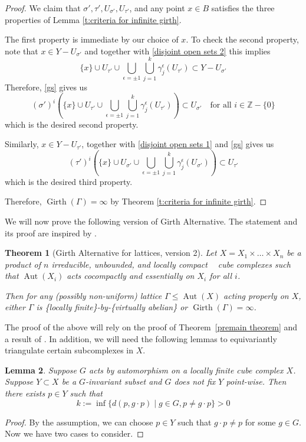 \documentclass{amsart}
\newtheorem{theorem}{Theorem}%
\newtheorem{lemma}[theorem]{Lemma}
\theoremstyle{definition}
\newtheorem*{Notation warning}{Warning on notations}
\newtheorem*{Sketch of proof}{Sketch of proof for Theorem C}
\newcommand{\gs}{\sigma }
\DeclareMathOperator{\cat}{CAT(0)}
\DeclareMathOperator{\Gir}{Girth}
\def\aut{\mathop{\mathrm{Aut}}\nolimits}
\begin{document}
\begin{sloppypar}
\begin{proof}
 We claim that $\gs',\tau',U_{\gs'},U_{\tau'}$, and any point $x\in B$ satisfies the three properties of Lemma \ref{t:criteria for infinite girth}.
 \medskip
 
 The first property is immediate by our choice of $x$.
 To check the second property, note that $x\in Y-U_{\gs'}$ and together with \eqref{disjoint open sets 2} this implies
\[
 \{x\}\cup U_{\tau'}\cup \bigcup_{\epsilon=\pm 1}\bigcup_{j=1}^k\gamma_j^\epsilon (U_{\tau'})\subset Y-U_{\gs'} 
 \] 
  Therefore, \eqref{gs} gives us
 \[
 (\gs')^i(\{x\}\cup U_{\tau'}\cup \bigcup_{\epsilon=\pm 1}\bigcup_{j=1}^k\gamma_j^\epsilon (U_{\tau'}))\subset U_{\gs'} \quad \text{for all } i\in \mathbb{Z}-\{0\}
 \]
 which is the desired second property.
 \medskip
 
\noindent Similarly, $x\in Y-U_{\tau'}$, together with \eqref{disjoint open sets 1} and \eqref{gs} gives us
 \[
 (\tau')^i(\{x\}\cup U_{\gs'}\cup \bigcup_{\epsilon=\pm 1}\bigcup_{j=1}^k\gamma_j^\epsilon (U_{\gs'}))\subset U_{\tau'}
 \]
 which is the desired third property.

 \noindent Therefore, $\Gir(\Gamma)=\infty$ by Theorem \ref{t:criteria for infinite girth}.
 \medskip
 \end{proof}
We will now prove the following version of Girth Alternative. The statement and its proof are inspired by  \cite[Corollary G]{Caprace_2011}.  

\begin{theorem}[Girth Alternative for lattices, version 2]\label{Girth alternative v2}
Let $X = X_1 \times \dots \times X_n$ be a product of $n$ irreducible, unbounded, and locally compact $\cat$ cube complexes such that $\aut(X_i)$ acts cocompactly and essentially on $X_i$ for all $i$.       
      
      Then for any (possibly non-uniform) lattice $\Gamma \leq \aut(X)$ acting properly on $X$, 
either $\Gamma$ is \{locally finite\}-by-\{virtually abelian\} or 
$\Gir(\Gamma)=\infty$.
\end{theorem}
The proof of the above will rely on the proof of Theorem~\ref{premain theorem} and a result of \cite{CL10}.
In addition, we will need the following lemmas to equivariantly triangulate  certain subcomplexes in $X$.
\begin{lemma}\label{l:positive translation length}
    Suppose $G$ acts by automorphism on a locally finite cube complex $X$. 
    Suppose $Y\subset X$ be a $G$-invariant subset and $G$ does not fix $Y$ point-wise.
    Then there exists  $p\in Y$ such that
    \[k:=\inf\{d(p,g\cdot p)\mid g\in G,p\neq g\cdot p\}>0
    \]
\end{lemma}
\begin{proof}
By the assumption, we can choose $p\in Y$ such that $g\cdot p\neq p$ for some $g\in G$. Now we have two cases to consider.


\end{proof}
\end{sloppypar}
\end{document}
